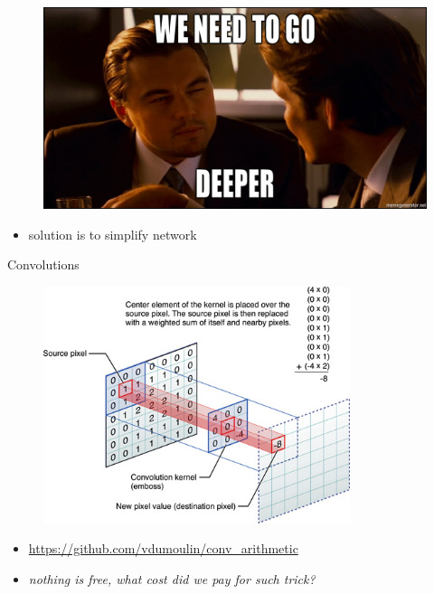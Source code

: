 \documentclass{beamer}
\begin{document}
\begin{frame}

\begin{figure}[h!]
  \centering
  \includegraphics[width=1\textwidth]{images/inception.png}
\end{figure}

\begin{itemize}
\item solution is to simplify network
\end{itemize}

\end{frame}


\begin{frame}{Convolutions}

\begin{figure}[h!]
  \centering
  \includegraphics[width=0.8\textwidth]{images/kernel_convolution.jpg}
\end{figure}

\begin{itemize}
\item \url{https://github.com/vdumoulin/conv_arithmetic}
\item \textit{nothing is free, what cost did we pay for such trick?}
\end{itemize}

\end{frame}
\end{document}
